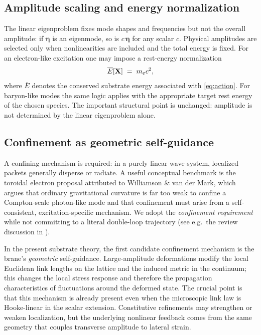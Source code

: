\subsection{Amplitude scaling and energy normalization}

The linear eigenproblem fixes mode shapes and frequencies but not the overall amplitude:
if $\bm{\eta}$ is an eigenmode, so is $c\,\bm{\eta}$ for any scalar $c$.
Physical amplitudes are selected only when nonlinearities are included and the total energy is fixed.
For an electron-like excitation one may impose a rest-energy normalization
\begin{equation}
  \overline{E}[\mathbf{X}] \;=\; m_e c^2,
  \label{eq:rest-energy-normalization}
\end{equation}
where $\overline{E}$ denotes the conserved substrate energy associated with \eqref{eq:action}.
For baryon-like modes the same logic applies with the appropriate target rest energy of the chosen species.
The important structural point is unchanged: amplitude is not determined by the linear eigenproblem alone.

\subsection{Confinement as geometric self-guidance}

A confining mechanism is required: in a purely linear wave system, localized packets generally disperse or radiate.
A useful conceptual benchmark is the toroidal electron proposal attributed to Williamson \& van der Mark, which argues
that ordinary gravitational curvature is far too weak to confine a Compton-scale photon-like mode and that confinement
must arise from a self-consistent, excitation-specific mechanism.
We adopt the \emph{confinement requirement} while not committing to a literal double-loop trajectory
(see e.g.\ the review discussion in \citep{HuygensOptics2025}).

In the present substrate theory, the first candidate confinement mechanism is the brane's \emph{geometric}
self-guidance.
Large-amplitude deformations modify the local Euclidean link lengths on the lattice and the induced metric in the
continuum; this changes the local stress response and therefore the propagation characteristics of fluctuations around
the deformed state.
The crucial point is that this mechanism is already present even when the microscopic link law is Hooke-linear in the
scalar extension.
Constitutive refinements may strengthen or weaken localization, but the underlying nonlinear feedback comes from the
same geometry that couples transverse amplitude to lateral strain.

